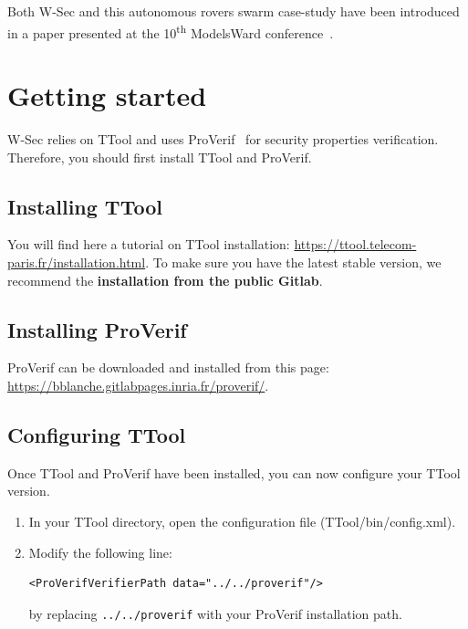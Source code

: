 \documentclass{article}
\begin{document}
Both W-Sec and this autonomous rovers swarm case-study have been introduced in a paper presented at the 10\textsuperscript{th} ModelsWard conference~\cite{wsec}.


\tableofcontents
\newpage


\section{Getting started}

W-Sec relies on TTool and uses ProVerif~\cite{proverif} for security properties verification. Therefore, you should first install TTool and ProVerif.

\subsection{Installing TTool}

You will find here a tutorial on TTool installation: \url{https://ttool.telecom-paris.fr/installation.html}. To make sure you have the latest stable version, we recommend the \textbf{installation from the public Gitlab}.

\subsection{Installing ProVerif}

ProVerif can be downloaded and installed from this page: \url{https://bblanche.gitlabpages.inria.fr/proverif/}.

\subsection{Configuring TTool}

Once TTool and ProVerif have been installed, you can now configure your TTool version.
\begin{enumerate}
	\item In your TTool directory, open the configuration file (TTool/bin/config.xml).
	\item Modify the following line: \begin{verbatim}<ProVerifVerifierPath data="../../proverif"/>\end{verbatim} by replacing \texttt{../../proverif} with your ProVerif installation path.
\end{enumerate}
\end{document}
